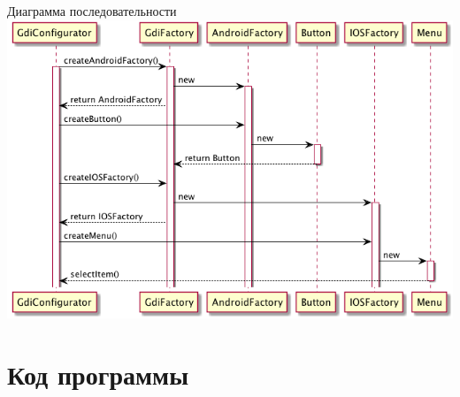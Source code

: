 \documentclass[PI,LAB]{HSEUniversity}
\begin{document}
\begin{FIGURE}[h]{Диаграмма последовательности\label{fig:example-figure}}
	\includegraphics[width=\textwidth]{out/diagrams/seq-go/seq-go}
\end{FIGURE}



\section{Код программы }



\lstset{extendedchars=\true}
\end{document}
